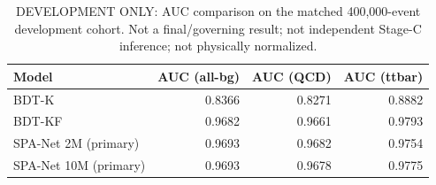 \begin{table}[htbp]
\centering
\caption{DEVELOPMENT ONLY: AUC comparison on the matched 400{,}000-event development cohort. Not a final/governing result; not independent Stage-C inference; not physically normalized.}
\begin{tabular}{lrrr}
\hline
Model & AUC (all-bg) & AUC (QCD) & AUC (ttbar) \\
\hline
BDT-K & 0.8366 & 0.8271 & 0.8882 \\
BDT-KF & 0.9682 & 0.9661 & 0.9793 \\
SPA-Net 2M (primary) & 0.9693 & 0.9682 & 0.9754 \\
SPA-Net 10M (primary) & 0.9693 & 0.9678 & 0.9775 \\
\hline
\end{tabular}
\end{table}
